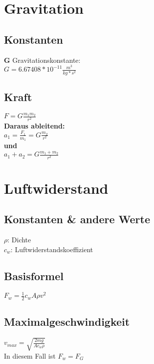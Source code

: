 \documentclass[10pt,a4paper]{article}
\title{\titleText}
\author{\authorText}
\date{\dateText}
\begin{document}
	\begin{multicols}{3}
		\section{Gravitation}
		\subsection{Konstanten}
		\textbf{G} Gravitationskonstante:\\
		\(G=6.67408*10^{-11}\frac{m^3}{kg*s^2} \)
		\subsection{Kraft}
		\(F=G\frac{m_1 m_2}{r^2} \)\\
		\textbf{Daraus ableitend:}\\
		\(a_1 = \frac{F_1}{m_1}=G\frac{m_2}{r^2} \)\\
		\textbf{und}\\
		\(a_1 + a_2 = G\frac{m_1 + m_2}{r^2}\)\\
		\section{Luftwiderstand}
		\subsection{Konstanten \& andere Werte}
		\(\rho\): Dichte\\
		\(c_w\): Luftwiderstandskoeffizient
		\subsection{Basisformel}
		\( F_w = \frac{1}{2} c_w A  \rho v^2 \)
		\subsection{Maximalgeschwindigkeit}
		\(v_{max} = \sqrt{\frac{2mg}{Ac_w\rho}} \)\\
		In diesem Fall ist \(F_w = F_G\)
	\end{multicols}
\end{document}
